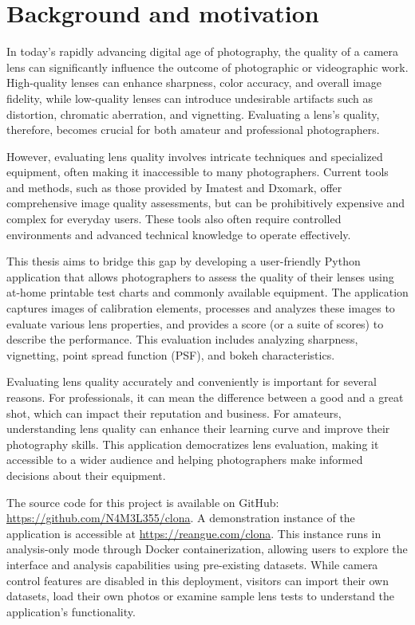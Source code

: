 \section*{Background and motivation}
In today's rapidly advancing digital age of photography, the quality of a camera lens can significantly influence the outcome of photographic or videographic work. High-quality lenses can enhance sharpness, color accuracy, and overall image fidelity, while low-quality lenses can introduce undesirable artifacts such as distortion, chromatic aberration, and vignetting. Evaluating a lens's quality, therefore, becomes crucial for both amateur and professional photographers.

However, evaluating lens quality involves intricate techniques and specialized equipment, often making it inaccessible to many photographers. Current tools and methods, such as those provided by Imatest and Dxomark, offer comprehensive image quality assessments, but can be prohibitively expensive and complex for everyday users. These tools also often require controlled environments and advanced technical knowledge to operate effectively.

This thesis aims to bridge this gap by developing a user-friendly Python application that allows photographers to assess the quality of their lenses using at-home printable test charts and commonly available equipment. The application captures images of calibration elements, processes and analyzes these images to evaluate various lens properties, and provides a score (or a suite of scores) to describe the performance. This evaluation includes analyzing sharpness, vignetting, point spread function (PSF), and bokeh characteristics.


Evaluating lens quality accurately and conveniently is important for several reasons. For professionals, it can mean the difference between a good and a great shot, which can impact their reputation and business. For amateurs, understanding lens quality can enhance their learning curve and improve their photography skills. This application democratizes lens evaluation, making it accessible to a wider audience and helping photographers make informed decisions about their equipment.



The source code for this project is available on GitHub: \url{https://github.com/N4M3L355/clona}. A demonstration instance of the application is accessible at \url{https://reangue.com/clona}. This instance runs in analysis-only mode through Docker containerization, allowing users to explore the interface and analysis capabilities using pre-existing datasets. While camera control features are disabled in this deployment, visitors can import their own datasets, load their own photos or examine sample lens tests to understand the application's functionality.


